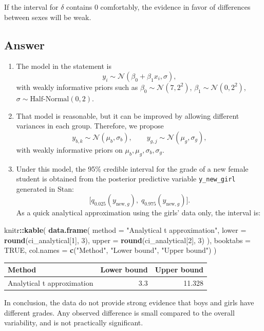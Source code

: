 \documentclass[
  english,
  12pt,
]{article}
\newenvironment{Shaded}{\begin{snugshade}}{\end{snugshade}}
\newcommand{\AttributeTok}[1]{\textcolor[rgb]{0.13,0.29,0.53}{#1}}
\newcommand{\ConstantTok}[1]{\textcolor[rgb]{0.56,0.35,0.01}{#1}}
\newcommand{\DecValTok}[1]{\textcolor[rgb]{0.00,0.00,0.81}{#1}}
\newcommand{\FunctionTok}[1]{\textcolor[rgb]{0.13,0.29,0.53}{\textbf{#1}}}
\newcommand{\NormalTok}[1]{#1}
\newcommand{\SpecialCharTok}[1]{\textcolor[rgb]{0.81,0.36,0.00}{\textbf{#1}}}
\newcommand{\StringTok}[1]{\textcolor[rgb]{0.31,0.60,0.02}{#1}}
\begin{document}
If the interval for \(\delta\) contains 0 comfortably, the evidence in
favor of differences between sexes will be weak.

\subsection{Answer}\label{answer}

\begin{enumerate}
\def\labelenumi{\arabic{enumi}.}
\item
  The model in the statement is \[
  y_i \sim \mathcal N(\beta_0 + \beta_1 x_i, \sigma),
  \] with weakly informative priors such as
  \(\beta_0 \sim \mathcal N(7,2^2)\),
  \(\beta_1 \sim \mathcal N(0,2^2)\),
  \(\sigma \sim \text{Half-Normal}(0,2)\).
\item
  That model is reasonable, but it can be improved by allowing different
  variances in each group. Therefore, we propose \[
  y_{b,k} \sim \mathcal N(\mu_b, \sigma_b), \qquad
  y_{g,j} \sim \mathcal N(\mu_g, \sigma_g),
  \] with weakly informative priors on
  \(\mu_b, \mu_g, \sigma_b, \sigma_g\).
\item
  Under this model, the 95\% credible interval for the grade of a new
  female student is obtained from the posterior predictive variable
  \texttt{y\_new\_girl} generated in Stan: \[
  \bigl[q_{0.025}(y_{\text{new},g}),\; q_{0.975}(y_{\text{new},g})\bigr].
  \] As a quick analytical approximation using the girls' data only, the
  interval is:
\end{enumerate}

\begin{Shaded}
\begin{Highlighting}[]
\NormalTok{knitr}\SpecialCharTok{::}\FunctionTok{kable}\NormalTok{(}
  \FunctionTok{data.frame}\NormalTok{(}
    \AttributeTok{method =} \StringTok{"Analytical t approximation"}\NormalTok{,}
    \AttributeTok{lower =} \FunctionTok{round}\NormalTok{(ci\_analytical[}\DecValTok{1}\NormalTok{], }\DecValTok{3}\NormalTok{),}
    \AttributeTok{upper =} \FunctionTok{round}\NormalTok{(ci\_analytical[}\DecValTok{2}\NormalTok{], }\DecValTok{3}\NormalTok{)}
\NormalTok{  ),}
  \AttributeTok{booktabs =} \ConstantTok{TRUE}\NormalTok{,}
  \AttributeTok{col.names =} \FunctionTok{c}\NormalTok{(}\StringTok{"Method"}\NormalTok{, }\StringTok{"Lower bound"}\NormalTok{, }\StringTok{"Upper bound"}\NormalTok{)}
\NormalTok{)}
\end{Highlighting}
\end{Shaded}

\begin{longtable}[]{@{}lrr@{}}
\toprule\noalign{}
Method & Lower bound & Upper bound \\
\midrule\noalign{}
\endhead
\bottomrule\noalign{}
\endlastfoot
Analytical t approximation & 3.3 & 11.328 \\
\end{longtable}

In conclusion, the data do not provide strong evidence that boys and
girls have different grades. Any observed difference is small compared
to the overall variability, and is not practically significant.
\end{document}
